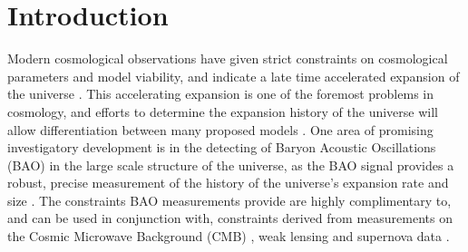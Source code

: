 \documentclass[titlesmallcaps, examinerscopy, copyrightpage]{uqthesis}
\begin{document}

\hypersetup{pageanchor=true}

\tableofcontents


\mainmatter


\chapter{Introduction}


Modern cosmological observations have given strict constraints on cosmological parameters and model viability, and indicate a late time accelerated expansion of the universe \citep{RiessFilippenko1998, PerlmutterAldering1999, SpergelVerde2003, RiessStrolger2004, TegmarkBlanton2004, SanchezBaugh2006, SpergelBean2007, Komatsu2009, RiessMacri2009, PercivalReid2010, ReidPercival2010,BlakeKazin2011}. This accelerating expansion is one of the foremost problems in cosmology, and efforts to determine the expansion history of the universe will allow differentiation between many proposed models \citep{SanchezScoccola2012, AlbrechtBernstein2006}. One area of promising investigatory development is in the detecting of Baryon Acoustic Oscillations (BAO) in the large scale structure of the universe, as the BAO signal provides a robust, precise measurement of the history of the universe's expansion rate and size \citep{BlakeGlazebrook2003,HuHaiman2003,SeoEisenstein2003,Linder2003}. The constraints BAO measurements provide are highly complimentary to, and can be used in conjunction with, constraints derived from measurements on the Cosmic Microwave Background (CMB) \citep{BennettHalpern2003, Planck201416}, weak lensing \citep{VanWaerbeke2000,WittmanTyson2000,KaiserWilson2000} and supernova data \citep{BetouleKessler2014, KowalskiRubin2008}.\\
\end{document}
